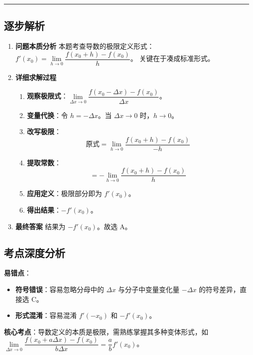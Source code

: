 \documentclass[UTF8,10pt]{ctexart}
\newenvironment{redenv}{\color{red}}{}
\newenvironment{detailedanalysis}{%
    \color{red}
    \begin{enumerate}[label=\textbf{第\arabic*步：}, leftmargin=*, align=left, itemsep=0pt, parsep=0pt, topsep=0pt, partopsep=0pt]
}{%
    \end{enumerate}
}
\newenvironment{conceptbox}{%
    \begin{tcolorbox}[colback=red!5, colframe=red!50!black, title=概念解析, fonttitle=\bfseries, top=2pt, bottom=2pt, left=2pt, right=2pt]
}{%
    \end{tcolorbox}
}
\newcommand{\analysisrule}{\noindent\rule{\textwidth}{0.8pt}\vspace{-0.5em}}
\begin{document}
\begin{redenv}
\analysisrule
\subsection*{逐步解析}

\begin{detailedanalysis}
\item \textbf{问题本质分析}
本题考查导数的极限定义形式：$f'(x_0) = \lim\limits_{h \to 0} \dfrac{f(x_0+h) - f(x_0)}{h}$。
关键在于凑成标准形式。

\item \textbf{详细求解过程}
\begin{enumerate}[label=(\alph*)]
    \item \textbf{观察极限式}：$\lim\limits_{\Delta x \to 0} \dfrac{f(x_0-\Delta x)-f(x_0)}{\Delta x}$。
    \item \textbf{变量代换}：令 $h = -\Delta x$。当 $\Delta x \to 0$ 时，$h \to 0$。
    \item \textbf{改写极限}：
    \[ \text{原式} = \lim\limits_{h \to 0} \dfrac{f(x_0+h)-f(x_0)}{-h} \]
    \item \textbf{提取常数}：
    \[ = -\lim\limits_{h \to 0} \dfrac{f(x_0+h)-f(x_0)}{h} \]
    \item \textbf{应用定义}：极限部分即为 $f'(x_0)$。
    \item \textbf{得出结果}：$-f'(x_0)$。
\end{enumerate}

\item \textbf{最终答案}
结果为 $-f'(x_0)$。故选 A。
\end{detailedanalysis}

\subsection*{考点深度分析}
\begin{conceptbox}
\textbf{易错点}：
\begin{itemize}
    \item \textbf{符号错误}：容易忽略分母中的 $\Delta x$ 与分子中变量变化量 $-\Delta x$ 的符号差异，直接选 C。
    \item \textbf{形式混淆}：容易混淆 $f'(-x_0)$ 和 $-f'(x_0)$。
\end{itemize}
\textbf{核心考点}：导数定义的本质是极限，需熟练掌握其多种变体形式，如 $\lim\limits_{\Delta x \to 0} \dfrac{f(x_0+a\Delta x) - f(x_0)}{b\Delta x} = \dfrac{a}{b}f'(x_0)$。
\end{conceptbox}
\end{redenv}
\end{document}
